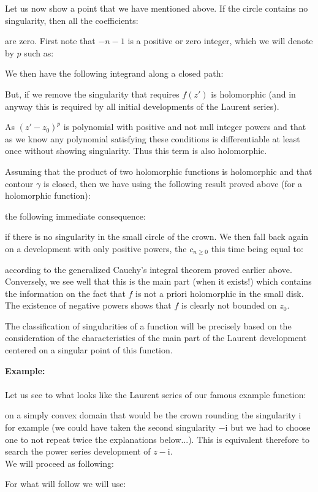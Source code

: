 	Let us now show a point that we have mentioned above. If the circle contains no singularity, then all the coefficients:
	
	are zero. First note that $-n-1$ is a positive or zero integer, which we will denote by $p$ such as:
	
	We then have the following integrand along a closed path:
	
	But, if we remove the singularity that requires $f(z')$ is holomorphic (and in anyway this is required by all initial developments of the Laurent series).
	
	As $(z'-z_0)^p$ is polynomial with positive and not null integer powers and that as we know any polynomial satisfying these conditions is differentiable at least once without showing singularity. Thus this term is also holomorphic.
	
	Assuming that the product of two holomorphic functions is holomorphic and that contour $\gamma$ is closed, then we have using the following result proved above (for a holomorphic function):
	
	the following immediate consequence:
	
	if there is no singularity in the small circle of the crown. We then fall back again on a development with only positive powers, the $c_{n\geq 0}$ this time being equal to:
	
	according to the generalized Cauchy's integral theorem proved earlier above. Conversely, we see well that this is the main part (when it exists!) which contains the information on the fact that $f$ is not a priori holomorphic in the small disk. The existence of negative powers shows that $f$ is clearly not bounded on $z_0$.
	
	The classification of singularities of a function will be precisely based on the consideration of the characteristics of the main part of the Laurent  development centered on a singular point of this function.
	\begin{tcolorbox}[colframe=black,colback=white,sharp corners]
	\textbf{{\Large {}}Example:}\\\\
	Let us see to what looks like the Laurent series of our famous example function:
	
	on a simply convex domain that would be the crown rounding the singularity  $\mathrm{i}$ for example (we could have taken the second singularity $-\mathrm{i}$ but we had to choose one to not repeat twice the explanations below...). This is equivalent therefore to search the power series development of $z-\mathrm{i}$. \\
	
	We will proceed as following:
	
	For what will follow we will use:
	
	\end{tcolorbox}
	
